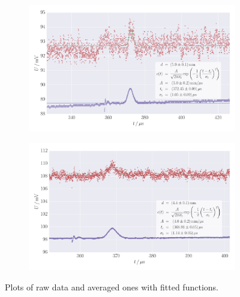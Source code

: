\begin{figure}
    \centering
    \begin{subfigure}[b]{\pltw}
        \includegraphics[width=1.0\linewidth]{figures/haynes_shockley_raw_22}
        \caption{}
        \label{fig:h_s_raw_22}
    \end{subfigure}
    \begin{subfigure}[b]{\pltw}
        \includegraphics[width=1.0\linewidth]{figures/haynes_shockley_raw_24}
        \caption{}
        \label{fig:h_s_raw_24}
    \end{subfigure}
    \caption{
        Plots of raw data and averaged ones with fitted functions. 
        }
    \label{fig:h_s_raw_plots}
\end{figure}
